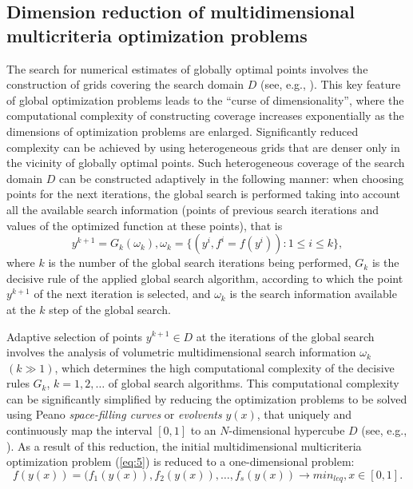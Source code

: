 \documentclass[smallextended]{svjour3}       %
\begin{document}
\subsection{Dimension reduction of multidimensional multicriteria optimization problems}

The search for numerical estimates of globally optimal points involves the construction of grids covering the search domain $D$ (see, e.g., \cite{c17,c18,c19,c20,c21,c22,c23,c24,c25}). This key feature of global optimization problems leads to the ``curse of dimensionality'', where the computational complexity of constructing coverage increases exponentially as the dimensions of optimization problems are enlarged. Significantly reduced complexity can be achieved by using heterogeneous grids that are denser only in the vicinity of globally optimal points. Such heterogeneous coverage of the search domain $D$ can be constructed adaptively in the following manner: when choosing points for the next iterations, the global search is performed taking into account all the available search information (points of previous search iterations and values of the optimized function at these points), that is
\begin{equation}\label{eq:9}
y^{k+1}=G_k(\omega_k), \omega_k=\{(y^i,f^i=f(y^i)): 1 \leq i \leq k \},
\end{equation}
where $k$ is the number of the global search iterations being performed, $G_k$ is the decisive rule of the applied global search algorithm, according to which the point $y^{k+1}$ of the next iteration is selected, and $\omega_k$ is the search information available at the $k$ step of the global search.

Adaptive selection of points $y^{k+1} \in D$ at the iterations of the global search involves the analysis of volumetric multidimensional search information $\omega_k$ $(k \gg 1)$, which determines the high computational complexity of the decisive rules $G_k$, $k=1,2,\dots$ of global search algorithms. This computational complexity can be significantly simplified by reducing the optimization problems to be solved using Peano \textit{space-filling curves} or \textit{evolvents} $y(x)$, that uniquely and continuously map the interval $[0,1]$ to an $N$-dimensional hypercube $D$ (see, e.g., \cite{c17,c18,c23}). As a result of this reduction, the initial multidimensional multicriteria optimization problem (\ref{eq:5}) is reduced to a one-dimensional problem:
\begin{equation}\label{eq:10}
f(y(x)) = (f_1(y(x)), f_2(y(x)), \dots , f_s(y(x)) \to min_{leq},  x \in [0,1].
\end{equation}
\end{document}
